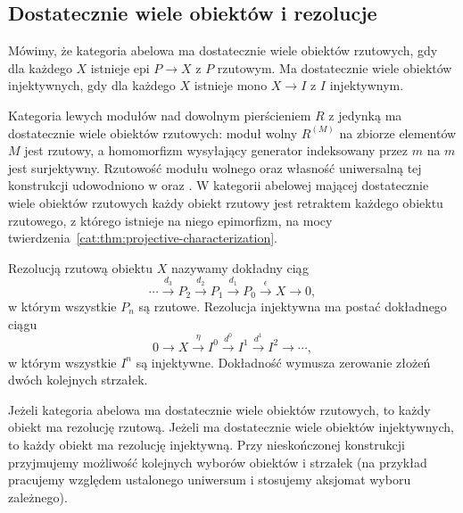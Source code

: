 \subsection{Dostatecznie wiele obiektów i rezolucje}
\begin{definicja}\label{cat:def:enough-projectives-injectives}
Mówimy, że kategoria abelowa ma dostatecznie wiele obiektów rzutowych, gdy dla każdego $X$ istnieje epi $P\to X$ z $P$ rzutowym. Ma dostatecznie wiele obiektów injektywnych, gdy dla każdego $X$ istnieje mono $X\to I$ z $I$ injektywnym.
\end{definicja}
\begin{przyklad}[Moduły]\label{cat:ex:enough-projectives-mod}
Kategoria lewych modułów nad dowolnym pierścieniem $R$ z jedynką ma dostatecznie wiele obiektów rzutowych: moduł wolny $R^{(M)}$ na zbiorze elementów $M$ jest rzutowy, a homomorfizm wysyłający generator indeksowany przez $m$ na $m$ jest surjektywny. Rzutowość modułu wolnego oraz własność uniwersalną tej konstrukcji udowodniono w  oraz . W kategorii abelowej mającej dostatecznie wiele obiektów rzutowych każdy obiekt rzutowy jest retraktem każdego obiektu rzutowego, z którego istnieje na niego epimorfizm, na mocy twierdzenia~\ref{cat:thm:projective-characterization}.
\end{przyklad}
\begin{definicja}[Rezolucje]\label{cat:def:resolutions}
Rezolucją rzutową obiektu $X$ nazywamy dokładny ciąg
\[
 \cdots\xrightarrow{d_3}P_2\xrightarrow{d_2}P_1
 \xrightarrow{d_1}P_0\xrightarrow{\epsilon}X\to0,
\]
w którym wszystkie $P_n$ są rzutowe. Rezolucja injektywna ma postać dokładnego ciągu
\[
 0\to X\xrightarrow{\eta}I^0\xrightarrow{d^0}I^1
 \xrightarrow{d^1}I^2\to\cdots,
\]
w którym wszystkie $I^n$ są injektywne. Dokładność wymusza zerowanie złożeń dwóch kolejnych strzałek.
\end{definicja}
\begin{twierdzenie}\label{cat:thm:resolution-existence}
Jeżeli kategoria abelowa ma dostatecznie wiele obiektów rzutowych, to każdy obiekt ma rezolucję rzutową. Jeżeli ma dostatecznie wiele obiektów injektywnych, to każdy obiekt ma rezolucję injektywną. Przy nieskończonej konstrukcji przyjmujemy możliwość kolejnych wyborów obiektów i strzałek (na przykład pracujemy względem ustalonego uniwersum i stosujemy aksjomat wyboru zależnego).
\end{twierdzenie}
